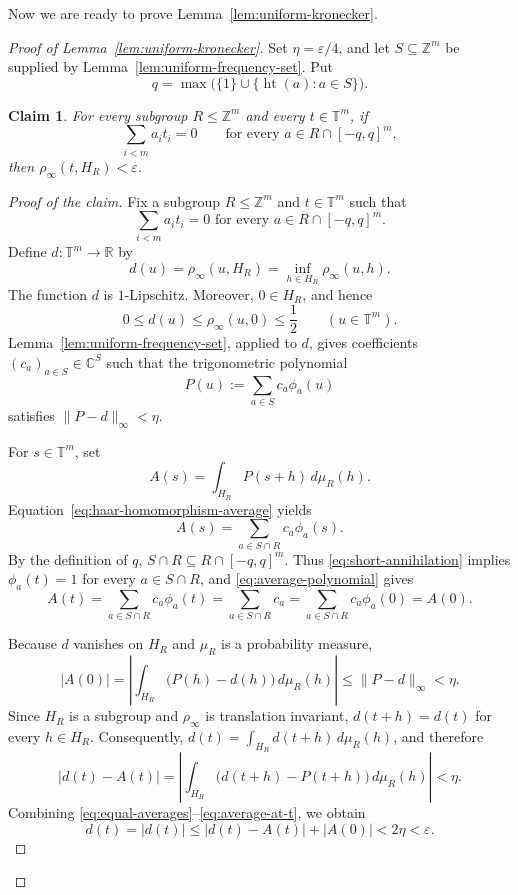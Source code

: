 \documentclass[11pt]{amsart}
\newtheorem*{claim}{Claim}
\theoremstyle{definition}
\newcommand{\T}{\mathbb T}
\newcommand{\Z}{\mathbb Z}
\newcommand{\htop}{\operatorname{ht}}
\begin{document}
Now we are ready to prove Lemma~\ref{lem:uniform-kronecker}.

\begin{proof}[Proof of Lemma~\ref{lem:uniform-kronecker}]
Set $\eta=\varepsilon/4$, and let $S\subseteq\Z^m$ be supplied by
Lemma~\ref{lem:uniform-frequency-set}.
Put
\[
 q=\max\bigl(\{1\}\cup\{\htop(a):a\in S\}\bigr).
\]

\begin{claim}
For every subgroup $R\leq\Z^m$ and every
$t\in\T^m$, if
\[
 \sum_{i<m}a_i t_i=0
 \qquad\text{for every }a\in R\cap[-q,q]^m,
\]
then $\rho_\infty(t,H_R)<\varepsilon$.
\end{claim}

\begin{proof}[Proof of the claim]
Fix a subgroup $R\leq\Z^m$ and $t\in\T^m$ such that
\begin{equation}\label{eq:short-annihilation}
 \sum_{i<m}a_i t_i=0\text{ for every }a\in R\cap[-q,q]^m.
\end{equation}
Define $d:\T^m\to\mathbb R$ by
\[
 d(u)=\rho_\infty(u,H_R)=\inf_{h\in H_R}\rho_\infty(u,h).
\]
The function $d$ is $1$-Lipschitz.
Moreover, $0\in H_R$, and hence
\[
 0\leq d(u)\leq\rho_\infty(u,0)\leq\frac12
 \qquad(u\in\T^m).
\]
Lemma~\ref{lem:uniform-frequency-set}, applied to $d$, gives coefficients
$(c_a)_{a\in S}\in\mathbb C^S$ such that the trigonometric polynomial
\[
 P(u):=\sum_{a\in S}c_a\phi_a(u)
\]
satisfies $\|P-d\|_\infty<\eta$.

For $s\in\T^m$, set
\[
 A(s)=\int_{H_R}P(s+h)\,d\mu_R(h).
\]
Equation~\eqref{eq:haar-homomorphism-average} yields
\begin{equation}\label{eq:average-polynomial}
 A(s)=\sum_{a\in S\cap R}c_{a}\phi_a(s).
\end{equation}
By the definition of $q$,
$S\cap R\subseteq R\cap[-q,q]^m$.  Thus
\eqref{eq:short-annihilation} implies $\phi_a(t)=1$ for every
$a\in S\cap R$, and \eqref{eq:average-polynomial} gives
\begin{equation}\label{eq:equal-averages}
 A(t)=\sum_{a\in S\cap R}c_a\phi_a(t)
     =\sum_{a\in S\cap R}c_a
     =\sum_{a\in S\cap R}c_a\phi_a(0)=A(0).
\end{equation}

Because $d$ vanishes on $H_R$ and $\mu_R$ is a probability measure,
\begin{equation}\label{eq:average-at-zero}
 |A(0)|
 =\left|\int_{H_R}\bigl(P(h)-d(h)\bigr)\,d\mu_R(h)\right|\leq\|P-d\|_\infty<\eta.
\end{equation}
Since $H_R$ is a subgroup and $\rho_\infty$ is translation invariant,
$d(t+h)=d(t)$ for every $h\in H_R$.  Consequently,
$d(t)=\int_{H_R}d(t+h)\,d\mu_R(h)$, and therefore
\begin{equation}\label{eq:average-at-t}
 |d(t)-A(t)|
 =\left|\int_{H_R}\bigl(d(t+h)-P(t+h)\bigr)\,d\mu_R(h)\right|
 <\eta.
\end{equation}
Combining \eqref{eq:equal-averages}--\eqref{eq:average-at-t}, we obtain
\[
 d(t)=|d(t)|
 \leq |d(t)-A(t)|+|A(0)|
 <2\eta<\varepsilon.
\]
\end{proof}


\end{proof}
\end{document}

